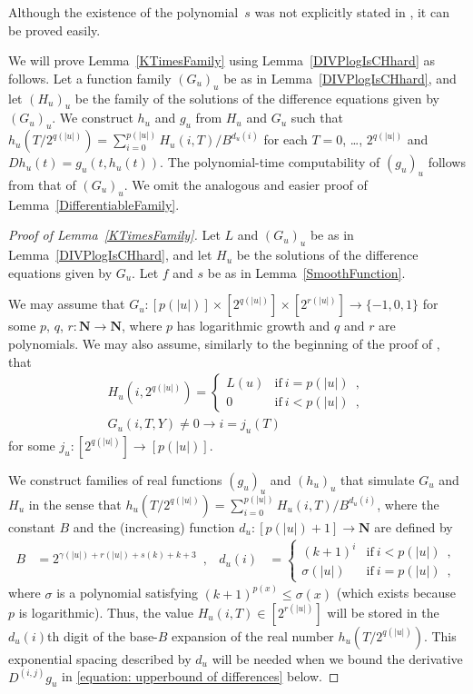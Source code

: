 \documentclass[12pt,a4paper]{article}
\theoremstyle{definition}
\theoremstyle{remark}
\newcommand{\N}{\mathbf N}
\newcommand{\D}{D}
\begin{document}
Although the existence of the polynomial~$s$ 
was not explicitly stated in \cite[Lemma 3.6]{ko1991complexity},
it can be proved easily.

We will prove Lemma~\ref{KTimesFamily} using Lemma~\ref{DIVPlogIsCHhard} as follows.
Let a function family $(G_u)_u$ be as in Lemma~\ref{DIVPlogIsCHhard},
and let $(H_u)_u$ be the family of the solutions of the difference equations given by $(G_u)_u$.
We construct $h_u$ and $g_u$ from $H_u$ and $G_u$ 
such that $h_u(T/2^{q(|u|)}) = \sum^{p(|u|)}_{i = 0} H_u(i, T)/B^{d_u(i)}$ for each $T = 0$, \ldots, $2^{q(|u|)}$
and $\D h_u(t) = g_u(t, h_u(t))$.
The polynomial-time computability of $(g_u)_u$ follows from that of $(G_u)_u$.
We omit the analogous and easier proof of Lemma~\ref{DifferentiableFamily}.

\begin{proof}[Proof of Lemma~\ref{KTimesFamily}]
Let $L$ and $(G_u)_u$ be as in Lemma~\ref{DIVPlogIsCHhard},
and let $H_u$ be the solutions of 
the difference equations given by $G_u$.
Let $f$ and $s$ be as in Lemma~\ref{SmoothFunction}.

We may assume that 
$G_u \colon [p(|u|)] \times [2^{q(|u|)}] \times [2^{r(|u|)}] \to \{-1, 0, 1\}$
for some $p$, $q$, $r \colon \N \to \N$, 
where $p$ has logarithmic growth and $q$ and $r$ are polynomials. 
We may also assume, similarly to the beginning of the proof of \cite[Lemma 4.1]{kawamura2010lipschitz},
that 
\begin{gather}
 H_u(i, 2^{q(|u|)}) = \begin{cases}
		       L(u) & \text{if} \ i=p(|u|) \enspace , \\
		       0 & \text{if} \ i<p(|u|) \enspace , 
		      \end{cases}
\\
 G_u(i, T, Y) \neq 0 \to i = j_u(T) \enspace 
\end{gather}
for some $
j _u \colon [2 ^{q (\lvert u \rvert)}] \to [p (\lvert u \rvert)]
$. 

We construct families of real functions $(g_u)_u$ and $(h_u)_u$ 
that simulate $G _u$ and $H _u$ 
in the sense that $h_u(T/2^{q(|u|)}) = \sum^{p(|u|)}_{i = 0}H_u(i, T)/B^{d_u(i)}$, 
where the constant $B$ and the 
(increasing) function $d_u \colon [p(|u|)+1] \to \N$ are 
defined by
  \begin{align}
   \label{eq:positioning}
   B &= 2^{\gamma(|u|) + r(|u|) + s(k) + k + 3} \enspace , 
   &
   d_u(i) &= 
   \begin{cases}
    (k+1)^i & \text{if} \ i<p(|u|) \enspace , 
    \\
    \sigma(|u|) & \text{if} \ i=p(|u|) \enspace , 
   \end{cases}
  \end{align}
where $\sigma$ is a polynomial satisfying $(k+1)^{p(x)} \le \sigma(x)$
(which exists because $p$ is logarithmic). 
Thus, the value $H _u (i, T) \in [2 ^{r (\lvert u \rvert)}]$ will be stored 
in the $d _u (i)$th digit of the base-$B$ expansion of 
the real number $h _u (T / 2 ^{q (\lvert u \rvert)})$. 
This exponential spacing described by $d _u$ will be needed
when we bound the derivative $\D ^{(i, j)} g _u$ 
in \eqref{equation: upperbound of differences} below. 


\end{proof}
\end{document}
